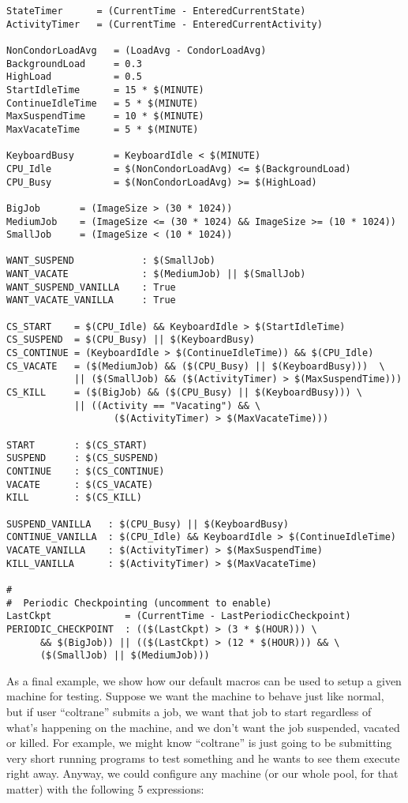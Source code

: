 \begin{verbatim}
StateTimer      = (CurrentTime - EnteredCurrentState)
ActivityTimer   = (CurrentTime - EnteredCurrentActivity)

NonCondorLoadAvg   = (LoadAvg - CondorLoadAvg)
BackgroundLoad     = 0.3
HighLoad           = 0.5
StartIdleTime      = 15 * $(MINUTE)
ContinueIdleTime   = 5 * $(MINUTE)
MaxSuspendTime     = 10 * $(MINUTE)
MaxVacateTime      = 5 * $(MINUTE)

KeyboardBusy       = KeyboardIdle < $(MINUTE)
CPU_Idle           = $(NonCondorLoadAvg) <= $(BackgroundLoad)
CPU_Busy           = $(NonCondorLoadAvg) >= $(HighLoad)

BigJob       = (ImageSize > (30 * 1024))
MediumJob    = (ImageSize <= (30 * 1024) && ImageSize >= (10 * 1024))
SmallJob     = (ImageSize < (10 * 1024))

WANT_SUSPEND            : $(SmallJob)
WANT_VACATE             : $(MediumJob) || $(SmallJob)
WANT_SUSPEND_VANILLA    : True
WANT_VACATE_VANILLA     : True

CS_START    = $(CPU_Idle) && KeyboardIdle > $(StartIdleTime)
CS_SUSPEND  = $(CPU_Busy) || $(KeyboardBusy)
CS_CONTINUE = (KeyboardIdle > $(ContinueIdleTime)) && $(CPU_Idle)
CS_VACATE   = ($(MediumJob) && ($(CPU_Busy) || $(KeyboardBusy)))  \
            || ($(SmallJob) && ($(ActivityTimer) > $(MaxSuspendTime)))
CS_KILL     = ($(BigJob) && ($(CPU_Busy) || $(KeyboardBusy))) \
            || ((Activity == "Vacating") && \
                   ($(ActivityTimer) > $(MaxVacateTime))) 

START       : $(CS_START)
SUSPEND     : $(CS_SUSPEND)
CONTINUE    : $(CS_CONTINUE)
VACATE      : $(CS_VACATE)
KILL        : $(CS_KILL)

SUSPEND_VANILLA   : $(CPU_Busy) || $(KeyboardBusy)
CONTINUE_VANILLA  : $(CPU_Idle) && KeyboardIdle > $(ContinueIdleTime)
VACATE_VANILLA    : $(ActivityTimer) > $(MaxSuspendTime)
KILL_VANILLA      : $(ActivityTimer) > $(MaxVacateTime)

#
#  Periodic Checkpointing (uncomment to enable)
LastCkpt             = (CurrentTime - LastPeriodicCheckpoint)
PERIODIC_CHECKPOINT  : (($(LastCkpt) > (3 * $(HOUR))) \
      && $(BigJob)) || (($(LastCkpt) > (12 * $(HOUR))) && \
      ($(SmallJob) || $(MediumJob)))
\end{verbatim}

As a final example, we show how our default macros can be used to
setup a given machine for testing.  Suppose we want the machine to
behave just like normal, but if user ``coltrane'' submits a job, we
want that job to start regardless of what's happening on the machine,
and we don't want the job suspended, vacated or killed.  For example,
we might know ``coltrane'' is just going to be submitting very short
running programs to test something and he wants to see them execute
right away.  Anyway, we could configure any machine (or our whole
pool, for that matter) with the following 5 expressions:

